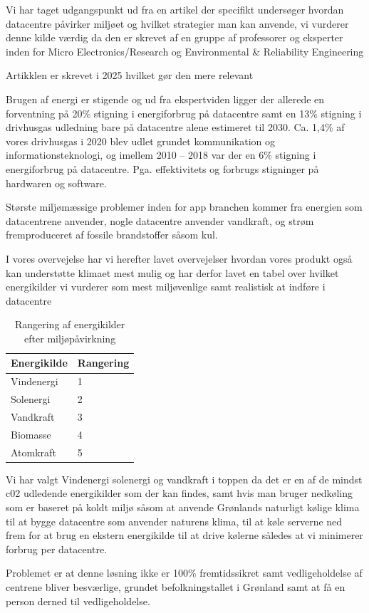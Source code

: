 Vi har taget udgangspunkt ud fra en artikel der specifikt undersøger hvordan datacentre påvirker miljøet og hvilket strategier man kan anvende, vi vurderer denne kilde værdig da den er skrevet af en gruppe af professorer og eksperter inden for Micro Electronics/Research og Environmental \& Reliability Engineering 

Artikklen er skrevet i 2025 hvilket gør den mere relevant 

Brugen af energi er stigende og ud fra ekspertviden ligger der allerede en forventning på 20\% stigning i energiforbrug på datacentre samt en 13\% stigning i drivhusgas udledning bare på datacentre alene estimeret til 2030. Ca. 1,4\% af vores drivhusgas i 2020 blev udlet grundet kommunikation og informationsteknologi, og imellem 2010 – 2018 var der en 6\% stigning i energiforbrug på datacentre. Pga. effektivitets og forbrugs stigninger på hardwaren og software. 

Største miljømæssige problemer inden for app branchen kommer fra energien som datacentrene anvender, nogle datacentre anvender vandkraft, og strøm fremproduceret af fossile brandstoffer såsom kul. 

I vores overvejelse har vi herefter lavet overvejelser hvordan vores produkt også kan understøtte klimaet mest mulig og har derfor lavet en tabel over hvilket energikilder vi vurderer som mest miljøvenlige samt realistisk at indføre i datacentre 


\begin{table}[H]
    \centering
    \begin{tabular}{|l|l|}
        \hline
        \textbf{Energikilde} & \textbf{Rangering} \\ \hline
        Vindenergi          & 1 \\ \hline
        Solenergi           & 2 \\ \hline
        Vandkraft           & 3 \\ \hline
        Biomasse            & 4 \\ \hline
        Atomkraft           & 5 \\ \hline
    \end{tabular}
    \caption{Rangering af energikilder efter miljøpåvirkning}
    \label{tab:co2_udledning}
\end{table}


Vi har valgt Vindenergi solenergi og vandkraft i toppen da det er en af de mindst c02 udledende energikilder som der kan findes, samt hvis man bruger nedkøling som er baseret på koldt miljø såsom at anvende Grønlands naturligt kølige klima til at bygge datacentre som anvender naturens klima, til at køle serverne ned frem for at brug en ekstern energikilde til at drive kølerne således at vi minimerer forbrug per datacentre. 

Problemet er at denne løsning ikke er 100\% fremtidssikret samt vedligeholdelse af centrene bliver besværlige, grundet befolkningstallet i Grønland samt at få en person derned til vedligeholdelse. 
